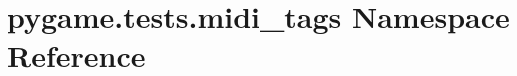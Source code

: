 \hypertarget{namespacepygame_1_1tests_1_1midi__tags}{}\section{pygame.\+tests.\+midi\+\_\+tags Namespace Reference}
\label{namespacepygame_1_1tests_1_1midi__tags}
